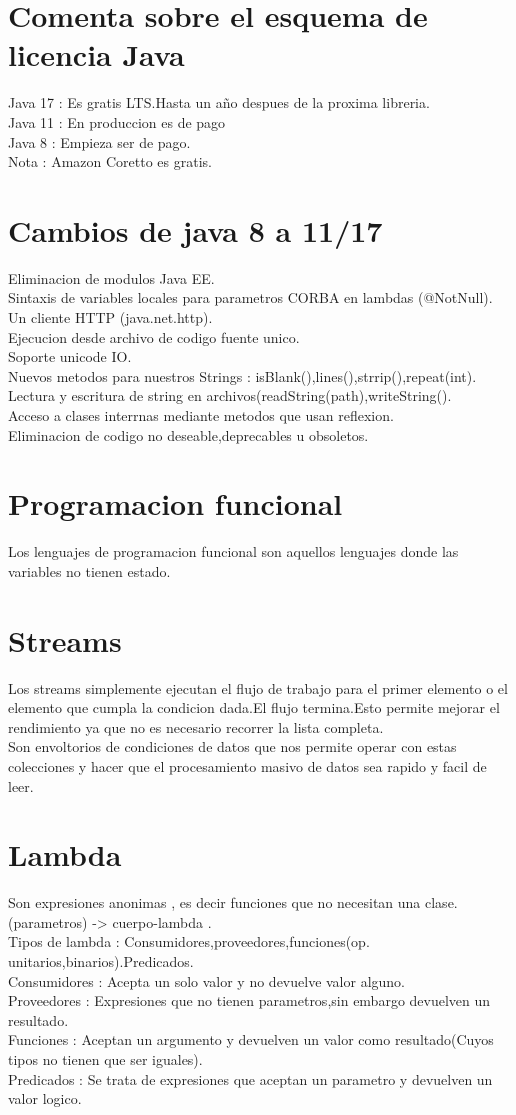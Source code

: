 \section{Comenta sobre el esquema de licencia Java}
Java 17 : Es gratis LTS.Hasta un año despues de la proxima libreria.\\
Java 11 : En produccion es de pago\\
Java 8 : Empieza ser de pago.\\
Nota : Amazon Coretto es gratis.
\section{Cambios de java 8 a 11/17}
Eliminacion de modulos Java EE.\\
Sintaxis de variables locales para parametros CORBA en lambdas (@NotNull).\\
Un cliente HTTP (java.net.http).\\
Ejecucion desde archivo de codigo fuente unico.\\
Soporte unicode IO.\\
Nuevos metodos para nuestros Strings : isBlank(),lines(),strrip(),repeat(int).\\
Lectura y escritura de string en archivos(readString(path),writeString().\\
Acceso a clases interrnas mediante metodos que usan reflexion.\\
Eliminacion de codigo no deseable,deprecables u obsoletos.
\section{Programacion funcional}
Los lenguajes de programacion funcional son aquellos lenguajes donde las variables no tienen estado.
\section{Streams}
Los streams simplemente ejecutan el flujo de trabajo para el primer elemento o el elemento que cumpla
la condicion dada.El flujo termina.Esto permite mejorar el rendimiento ya que no es necesario recorrer
 la lista completa.\\
 Son envoltorios de condiciones de datos que nos permite operar con estas colecciones y hacer que el procesamiento
 masivo de datos sea rapido y facil de leer.
\section{Lambda}
Son expresiones anonimas , es decir funciones que no necesitan una clase. (parametros) -> { cuerpo-lambda} .\\
Tipos de lambda : Consumidores,proveedores,funciones(op. unitarios,binarios).Predicados.\\
Consumidores : Acepta un solo valor y no devuelve valor alguno.\\
Proveedores : Expresiones que no tienen parametros,sin embargo devuelven un resultado.\\
Funciones : Aceptan un argumento y devuelven un valor como resultado(Cuyos tipos no tienen que ser iguales).\\
Predicados : Se trata de expresiones que aceptan un parametro y devuelven un valor logico. 
